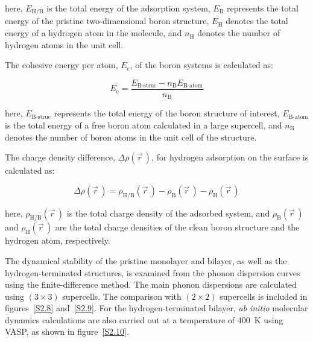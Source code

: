 here, $E_{\mathrm{H/B}}$ is the total energy of the adsorption system,
$E_{\mathrm{B}}$ represents the total energy of the pristine two-dimensional boron structure,
$E_{\mathrm{H}}$ denotes the total energy of a hydrogen atom in the  molecule,
and $n_{\mathrm{H}}$ denotes the number of hydrogen atoms in the unit cell.

The cohesive energy per atom, $E_{\mathrm{c}}$, of the boron systems is calculated as:

\begin{equation}
    E_{\mathrm{c}}
    = \frac{E_{\mathrm{B\text{-}struc}} - n_{\mathrm{B}}E_{\mathrm{B\text{-}atom}}}{n_{\mathrm{B}}}
\label{cohesive_energy_per_atom}
\end{equation}

here,
$E_{\mathrm{B\text{-}struc}}$ represents the total energy of the boron structure of interest,
$E_{\mathrm{B\text{-}atom}}$ is the total energy of a free boron atom calculated in a large supercell,
and $n_{\mathrm{B}}$ denotes the number of boron atoms in the unit cell of the structure.

The charge density difference, $\Delta \rho(\vec{r}\,)$, for hydrogen adsorption on the surface is calculated as:

\begin{equation}
    \Delta \rho(\vec{r}\,) =
    \rho_{\mathrm{H/B}}(\vec{r}\,)
    - \rho_{\mathrm{B}}(\vec{r}\,)
    - \rho_{\mathrm{H}}(\vec{r}\,)
\label{charge_density_difference_hydrogen_adsorption}
\end{equation}

here, $\rho_{\mathrm{H/B}}(\vec{r}\,)$ is the total charge density of the adsorbed system,
and $\rho_{\mathrm{B}}(\vec{r}\,)$ and $\rho_{\mathrm{H}}(\vec{r}\,)$ are the total charge densities of the clean boron structure and the hydrogen atom,
respectively.

The dynamical stability of the pristine monolayer and bilayer,
as well as the hydrogen-terminated structures,
is examined from the phonon dispersion curves using the finite-difference method.
The main phonon dispersions are calculated using $(3\times3)$ supercells.
The comparison with $(2\times2)$ supercells is included in figures~\ref{S2.8} and~\ref{S2.9}.
For the hydrogen-terminated bilayer,
\textit{ab initio} molecular dynamics calculations are also carried out at a temperature of \qty{400}{K} using VASP,
as shown in figure~\ref{S2.10}.

